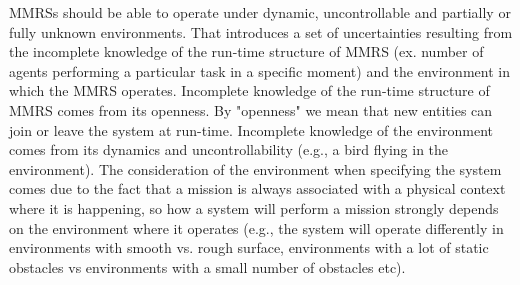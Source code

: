 \documentclass[journal]{IEEEtran}
\theoremstyle{definition}
\newcommand\patrizio[1]{\nb{Patrizio}{#1}}
\newcommand\ivano[1]{\nb{Ivano}{#1}}
\begin{document}
 

 MMRSs should be able to operate under dynamic, uncontrollable and partially or fully unknown environments.
That introduces a set of uncertainties resulting from the incomplete knowledge of the run-time structure of MMRS (ex. number of agents performing a particular task in a specific moment) and the environment in which the MMRS operates. Incomplete knowledge of the run-time structure of MMRS comes from its openness. By "openness" we mean that new entities can join or leave the system at run-time. Incomplete knowledge of the environment comes from its dynamics and uncontrollability (e.g., a bird flying in the environment). The consideration of the environment when specifying the system comes due to the fact that a mission is always associated with a physical context where it is happening, so how a system will perform a mission strongly depends on the environment where it operates (e.g., the system will operate differently in environments with smooth vs. rough surface, environments  with a lot of static obstacles vs environments with a small number of obstacles etc). 
\end{document}
